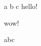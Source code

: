 \documentclass[uplatex]{jsarticle}
\begin{document}
\def\hello{hello!}

\begin{buffer}[oh]
a b c \hello
\end{buffer}

\begin{buffer}[label]
wow!
\end{buffer}

\getbuffer[oh]


abc

\getbuffer[label]
\end{document}
